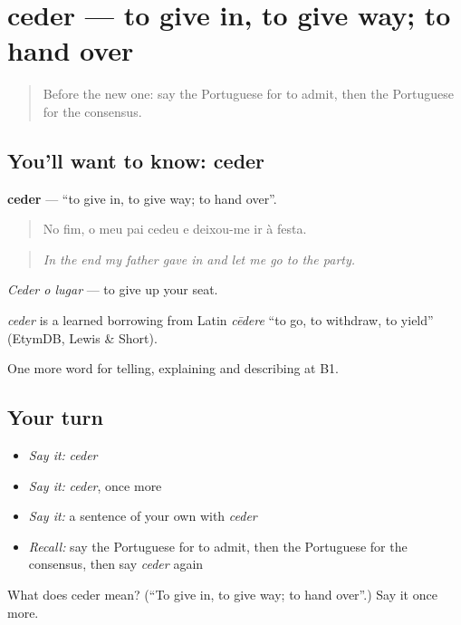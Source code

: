 \section[ceder]{ceder — to give in, to give way; to hand over}

\label{lesson:PT-C339-ceder}



\begin{quote}
Before the new one: say the Portuguese for to admit, then the Portuguese for the consensus.
\end{quote}

\subsection*{You'll want to know: ceder}
\textbf{ceder} — \textquotedblleft{}to give in, to give way; to hand over\textquotedblright{}.

\begin{quote}
No fim, o meu pai cedeu e deixou-me ir à festa.
\end{quote}

\begin{quote}
\emph{In the end my father gave in and let me go to the party.}
\end{quote}

\emph{Ceder o lugar} — to give up your seat.

\begin{cousinweb}
\emph{ceder} is a learned borrowing from Latin \emph{cēdere} \textquotedblleft{}to go, to withdraw, to yield\textquotedblright{} (EtymDB, Lewis \& Short).
\end{cousinweb}

\begin{grammarlens}[title={What you've built}]
One more word for telling, explaining and describing at B1.
\end{grammarlens}

\subsection*{Your turn}
\begin{itemize}
\raggedright
  \item \emph{Say it:} \emph{ceder}
  \item \emph{Say it:} \emph{ceder}, once more
  \item \emph{Say it:} a sentence of your own with \emph{ceder}
  \item \emph{Recall:} say the Portuguese for to admit, then the Portuguese for the consensus, then say \emph{ceder} again
\end{itemize}

\begin{tcolorbox}[breakable,colback=teal!4,colframe=teal!35!black,title={Before you move on}]
What does ceder mean? (\textquotedblleft{}To give in, to give way; to hand over\textquotedblright{}.) Say it once more.
\end{tcolorbox}
